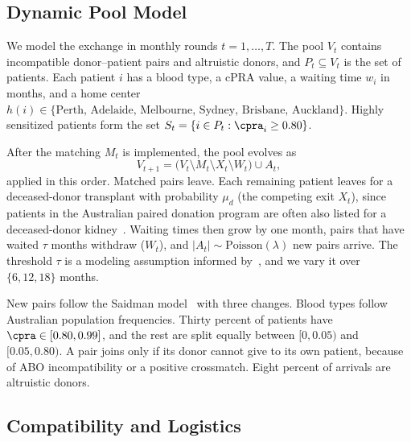 \documentclass[journal]{IEEEtran}
\begin{document}
\subsection{Dynamic Pool Model}
\label{sec:problem:model}

We model the exchange in monthly rounds $t = 1,\dots,T$. The pool $V_t$
contains incompatible donor--patient pairs and altruistic donors, and
$P_t \subseteq V_t$ is the set of patients. Each patient $i$ has a blood
type, a cPRA value, a waiting time $w_i$ in months, and a home center
$h(i) \in \{\text{Perth, Adelaide, Melbourne, Sydney, Brisbane, Auckland}\}$. Highly sensitized patients form the set
$S_t = \{ i \in P_t : \cpra_i \geq 0.80 \}$.

After the matching $M_t$ is implemented, the pool evolves as
\begin{equation}
  V_{t+1} = \bigl(V_t \setminus M_t \setminus X_t \setminus W_t\bigr)
            \cup A_t ,
  \label{eq:pool}
\end{equation}
applied in this order. Matched pairs leave. Each remaining patient
leaves for a deceased-donor transplant with probability $\mu_d$ (the
competing exit $X_t$), since patients in the Australian paired donation
program are often also listed for a deceased-donor
kidney~\cite{Ferrari2012}. Waiting times then grow by one month, pairs
that have waited $\tau$ months withdraw ($W_t$), and
$|A_t| \sim \mathrm{Poisson}(\lambda)$ new pairs arrive. The threshold
$\tau$ is a modeling assumption informed by~\cite{Ferrari2012}, and we
vary it over $\{6, 12, 18\}$ months.

New pairs follow the Saidman model~\cite{saidman2006increasing} with
three changes. Blood types follow Australian population frequencies.
Thirty percent of patients have $\cpra \in [0.80, 0.99]$, and the rest
are split equally between $[0, 0.05)$ and $[0.05, 0.80)$. A pair joins
only if its donor cannot give to its own patient, because of ABO
incompatibility or a positive crossmatch. Eight percent of arrivals are
altruistic donors.

\subsection{Compatibility and Logistics}
\label{sec:problem:compat}
\end{document}
